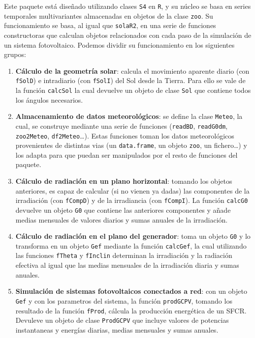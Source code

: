 Este paquete está diseñado utilizando clases \texttt{S4} en \texttt{R}, y su núcleo se basa en series temporales multivariantes almacenadas en objetos de la clase \texttt{zoo}. Su funcionamiento se basa, al igual que \texttt{solaR2}, en una serie de funciones constructoras que calculan objetos relacionados con cada paso de la simulación de un sistema fotovoltaico. Podemos dividir su funcionamiento en los siguientes grupos:
\begin{enumerate}
\item \textbf{Cálculo de la geometría solar}: calcula el movimiento aparente diario (con \texttt{fSolD}) e intradiario (con \texttt{fSolI}) del Sol desde la Tierra. Para ello se vale de la función \texttt{calcSol} la cual devuelve un objeto de clase \texttt{Sol} que contiene todos los ángulos necesarios.
\item \textbf{Almacenamiento de datos meteorológicos}: se define la clase \texttt{Meteo}, la cual, se construye mediante una serie de funciones (\texttt{readBD}, \texttt{readG0dm}, \texttt{zoo2Meteo}, \texttt{df2Meteo}\ldots{}). Estas funciones toman los datos meteorológicos provenientes de distintas vias (un \texttt{data.frame}, un objeto \texttt{zoo}, un fichero\ldots{}) y los adapta para que puedan ser manipulados por el resto de funciones del paquete.
\item \textbf{Cálculo de radiación en un plano horizontal}: tomando los objetos anteriores, es capaz de calcular (si no vienen ya dadas) las componentes de la irradiación (con \texttt{fCompD}) y de la irradiancia (con \texttt{fCompI}). La función \texttt{calcG0} devuelve un objeto \texttt{G0} que contiene las anteriores componentes y añade medias mensuales de valores diarios y sumas anuales de la irradiación.
\item \textbf{Cálculo de radiación en el plano del generador}: toma un objeto \texttt{G0} y lo transforma en un objeto \texttt{Gef} mediante la función \texttt{calcGef}, la cual utilizando las funciones \texttt{fTheta} y \texttt{fInclin} determinan la irradiación y la radiación efectiva al igual que las medias mensuales de la irradiación diaria y sumas anuales.
\item \textbf{Simulación de sistemas fotovoltaicos conectados a red}: con un objeto \texttt{Gef} y con los parametros del sistema, la función \texttt{prodGCPV}, tomando los resultado de la función \texttt{fProd}, cálcula la producción energética de un SFCR. Devuleve un objeto de clase \texttt{ProdGCPV} que incluye valores de potencias instantaneas y energías diarias, medias mensuales y sumas anuales.

\end{enumerate}
